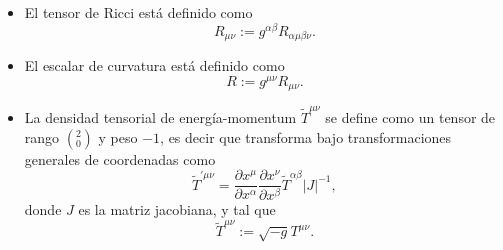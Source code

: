 \begin{itemize}
\begin{equation}
\end{equation}
\item El tensor de Ricci está definido como
\begin{equation}
R_{\mu \nu} := g^{\alpha \beta} R_{\alpha \mu \beta \nu}.
\end{equation}
\item El escalar de curvatura está definido como 
\begin{equation}
R := g^{\mu \nu} R_{\mu \nu}.
\end{equation}
\item La densidad tensorial de energía-momentum $\tilde{T}^{\mu \nu}$ se define como un tensor de rango $\left(^2_0 \right)$ y peso $-1$, es decir que transforma bajo transformaciones generales de coordenadas como 
\begin{equation}
\tilde{T}^{'\mu \nu} =  \frac{\partial x^{\mu}}{\partial x^{\alpha}} \frac{\partial x^{\nu}}{\partial x^{\beta}} \tilde{T}^{\alpha \beta} | J |^{-1},
\end{equation}
donde $J$ es la matriz jacobiana, y tal que
\begin{equation}
\tilde{T}^{\mu \nu} := \sqrt{-g} T^{\mu \nu}.
\end{equation}
\end{itemize}
